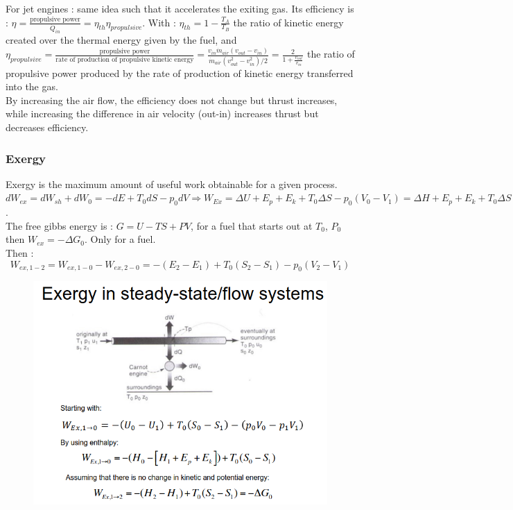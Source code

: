 \documentclass[../main.tex]{subfiles}
\begin{document}
For jet engines : same idea such that it accelerates the exiting gas. Its efficiency is : $\eta = \frac{\text{propulsive power}}{\dot{Q}_{in}} = \eta_{th} \eta_{propulsive}$. With : $\eta_{th} = 1-\frac{T_A}{T_B}$ the ratio of kinetic energy created over the thermal energy given by the fuel, and $\eta_{propulsive} = \frac{\text{propulsive power}}{\text{rate of production of propulsive kinetic energy}} = \frac{v_{in} \dot{m}_{air} (v_{out}-v_{in})}{\dot{m}_{air} (v_{out}^2-v_{in}^2)/2} = \frac{2}{1+ \frac{v_{out}}{v_{in}}}$ the ratio of propulsive power produced by the rate of production of kinetic energy transferred into the gas.\\
By increasing the air flow, the efficiency does not change but thrust increases, while increasing the difference in air velocity (out-in) increases thrust but decreases efficiency.\\

\subsubsection{Exergy}
Exergy is the maximum amount of useful work obtainable for a given process. $dW_{ex} = dW_{sh} + dW_0 = -dE + T_0dS -p_0dV \Rightarrow W_{Ex} = \Delta U + E_p + E_k + T_0 \Delta S - p_0(V_0-V_1) = \Delta H + E_p + E_k + T_0 \Delta S$.\\

\warning The free gibbs energy is : $G = U-TS+PV$, for a fuel that starts out at $T_0$, $P_0$ then $W_{ex} = -\Delta G_0$. Only for a fuel.\\

Then : \begin{equation}
    W_{ex, 1-2} = W_{ex,1-0} - W_{ex,2-0} = -(E_2-E_1) + T_0(S_2-S_1) - p_0(V_2-V_1)
\end{equation}

\begin{figure}[hbt!]
    \centering
    \includegraphics[width=0.8\linewidth]{IMAGES/ESE/Screenshot from 2025-03-11 15-38-32.png}
\end{figure}
\end{document}
